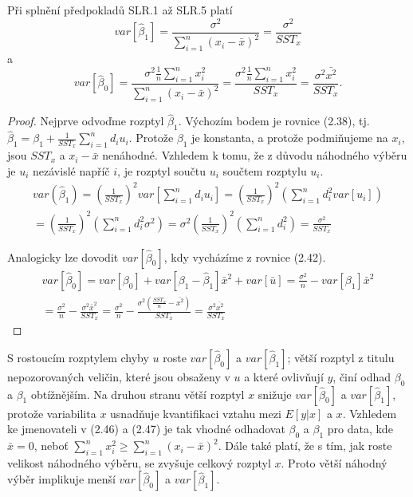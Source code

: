 \begin{theorem}
Při splnění předpokladů SLR.1 až SLR.5 platí
\begin{equation}
var[\hat{\beta}_1] = \frac{\sigma^2}{\sum_{i = 1}^n (x_i - \bar{x})^2} = \frac{\sigma^2}{SST_x}
\end{equation}
a
\begin{equation}
var[\hat{\beta}_0] = \frac{\sigma^2 \frac{1}{n}\sum_{i = 1}^n x_i^2}{\sum_{i = 1}^n (x_i - \bar{x})^2} = \frac{\sigma^2 
\frac{1}{n}\sum_{i = 1}^n x_i^2}{SST_x} = \frac{\sigma^2 \bar{x^2}}{SST_x}.
\end{equation}

\raggedleft{$\clubsuit$}
\end{theorem}

\begin{proof}
Nejprve odvoďme rozptyl $\hat{\beta}_1$. Výchozím bodem je rovnice (2.38), tj. $\hat{\beta}_1 = \beta_1 + \frac{1}{SST_x}\sum_{i = 1}^n d_i u_i$. Protože $\beta_1$ je 
konstanta, a protože podmiňujeme na $x_i$, jsou $SST_x$ a $x_i - \bar{x}$ nenáhodné. Vzhledem k tomu, že z důvodu 
náhodného výběru je $u_i$ nezávislé napříč $i$, je rozptyl součtu $u_i$ součtem rozptylu $u_i$.
\begin{multline}
var(\hat{\beta}_1) = \left(\frac{1}{SST_x}\right)^2 var\left[\sum_{i = 1}^n d_i u_i \right] = 
\left(\frac{1}{SST_x}\right)^2 \left(\sum_{i = 1}^n d_i^2 var[u_i] \right)\\
= \left(\frac{1}{SST_x}\right)^2 \left(\sum_{i = 1}^n d_i^2 \sigma^2 \right) = \sigma^2 \left(\frac{1}{SST_x}\right)^2 
\left(\sum_{i = 1}^n d_i^2 \right) = \frac{\sigma^2}{SST_x}
\end{multline}

Analogicky lze dovodit $var[\hat{\beta}_0]$, kdy vycházíme z rovnice (2.42).
\begin{multline}
var[\hat{\beta}_0] = var[\beta_0] + var[\beta_1 - \hat{\beta}_1]\bar{x}^2 + var[\bar{u}] = \frac{\sigma^2}{n} - var[\beta_1]\bar{x}^2\\
= \frac{\sigma^2}{n} - \frac{\sigma^2 \bar{x}^2}{SST_x} = \frac{\sigma^2}{n} - \frac{\sigma^2 (\frac{SST_x}{n} - 
\bar{x^2})}{SST_x} = \frac{\sigma^2 \bar{x^2}}{SST_x}
\end{multline}

\raggedleft{$\clubsuit$}
\end{proof}

S rostoucím rozptylem chyby $u$ roste $var[\hat{\beta}_0]$ a $var[\hat{\beta}_1]$; větší rozptyl z titulu 
nepozorovaných veličin, které jsou obsaženy v $u$ a které ovlivňují $y$, činí odhad $\beta_0$ a $\beta_1$ obtížnějším. 
Na druhou stranu větší rozptyl $x$ snižuje $var[\hat{\beta}_0]$ a $var[\hat{\beta}_1]$, protože variabilita $x$ 
usnadňuje kvantifikaci vztahu mezi $E[y|x]$ a $x$. Vzhledem ke jmenovateli v (2.46) a (2.47) je tak vhodné odhadovat $\beta_0$ a $\beta_1$ pro data, kde $\bar{x} = 0$, 
neboť $\sum_{i = 1}^n x_i^2 \ge \sum_{i = 1}^n (x_i - \bar{x})^2$. Dále také platí, že s tím, jak roste velikost náhodného výběru, se 
zvyšuje celkový rozptyl $x$. Proto větší náhodný výběr implikuje menší $var[\hat{\beta}_0]$ a $var[\hat{\beta}_1]$.

